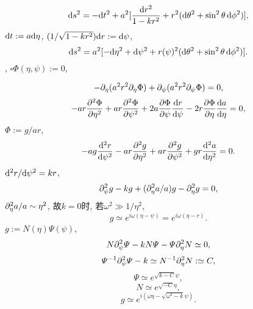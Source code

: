 \begin{equation}
    \mathrm{d} s^2=-\mathrm{d} t^2+a^2[\frac{\mathrm{d} r^2}{1-kr^2}+r^2(\mathrm{d}\theta^2+\sin^2\theta\,\mathrm{d}\phi^2)],
\end{equation}
$\mathrm{d} t:=a\mathrm{d}\eta$, $(1/\sqrt{1-kr^2})\mathrm{d} r:=\mathrm{d}\psi$,
\begin{equation}
    \mathrm{d} s^2=a^2[-\mathrm{d}\eta^2+\mathrm{d}\psi^2+r(\psi)^2(\mathrm{d}\theta^2+\sin^2\theta\,\mathrm{d}\phi^2)].
\end{equation}
\cite{Maggiore2014}, $\square\Phi(\eta,\psi):=0$, %
\begin{comment}
\begin{equation}
    \sqrt{-g}=a^4r^2\sin\theta,
\end{equation}
\begin{equation}
    \p_\eta(-(a^4r^2\sin\theta)a^{-2}\p_\eta\Phi)+\p_\psi((a^4r^2\sin\theta)a^{-2}\p_\psi\Phi)=0,
\end{equation}
\end{comment}
\begin{equation}
    -\partial_\eta(a^2r^2\partial_\eta\Phi)+\partial_\psi(a^2r^2\partial_\psi\Phi)=0,
\end{equation}
\begin{equation}
    - a r \frac{\partial^{2}\Phi}{\partial \eta^{2}}  + a r \frac{\partial^{2}\Phi}{\partial \psi^{2}}  + 2 a \frac{\partial\Phi}{\partial \psi}  \frac{\mathrm{d} r}{\mathrm{d} \psi}  - 2 r \frac{\partial\Phi}{\partial \eta}  \frac{\mathrm{d} a}{\mathrm{d} \eta} =0,
\end{equation}
$\Phi:=g/ar$,
\begin{equation}
    - a g \frac{\mathrm{d}^{2}r}{\mathrm{d} \psi^{2}}  - a r \frac{\partial^{2}g}{\partial \eta^{2}}  + a r \frac{\partial^{2}g}{\partial \psi^{2}}  + g r \frac{\mathrm{d}^{2}a}{\mathrm{d} \eta^{2}} =0.
\end{equation}
${\mathrm{d}^{2}r/\mathrm{d} \psi^{2}}=kr$,
\begin{equation}
    \partial_\psi^2g-kg+(\partial_\eta^2a/a)g-\partial_\eta^2g=0,
\end{equation}
$\partial_\eta^2a/a\sim\eta^2$, 故$k = 0$时, 若$\omega^2\gg1/\eta^2$,
\begin{equation}
    g\simeq e^{i\omega(\eta-\psi)}=e^{i\omega(\eta-r)}.
\end{equation}
$g:=N(\eta)\varPsi(\psi)$,
\begin{equation}
    N\partial_\psi^2\varPsi-kN\varPsi-\varPsi\partial_\eta^2N\simeq0,
\end{equation}
\begin{equation}
    \varPsi^{-1}\partial_\psi^2\varPsi-k\simeq N^{-1}\partial_\eta^2N:\simeq C,
\end{equation}
\begin{equation}
    \varPsi\simeq e^{\sqrt{k-C}\psi},
\end{equation}
\begin{equation}
    N\simeq e^{\sqrt{-C}\eta},
\end{equation}
\begin{equation}
    g\simeq e^{i(\omega\eta-\sqrt{\omega^2-k}\psi)}.
\end{equation}
